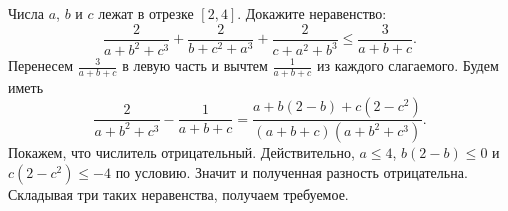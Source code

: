 \problem{}
Числа $a$, $b$ и $c$ лежат в отрезке $[2, 4]$.
Докажите неравенство:
\[
    \frac{2}{a + b^2 + c^3}
    +
    \frac{2}{b + c^2 + a^3}
    +
    \frac{2}{c + a^2 + b^3}
\leq
    \frac{3}{a + b + c}
.\]
\solution
Перенесем $\frac{3}{a + b + c}$ в левую часть и вычтем $\frac{1}{a + b + c}$ из
каждого слагаемого.
Будем иметь
\[
    \frac{2}{a + b^2 + c^3} - \frac{1}{a + b + c}
=
    \frac{a + b (2 - b) + c (2 - c^2)}{(a + b + c) (a + b^2 + c^3)}
.\]
Покажем, что числитель отрицательный.
Действительно, $a \leq 4$, $b (2 - b) \leq 0$ и $c (2 - c^2) \leq -4$ по
условию.
Значит и полученная разность отрицательна.
Складывая три таких неравенства, получаем требуемое.
\endproblem
